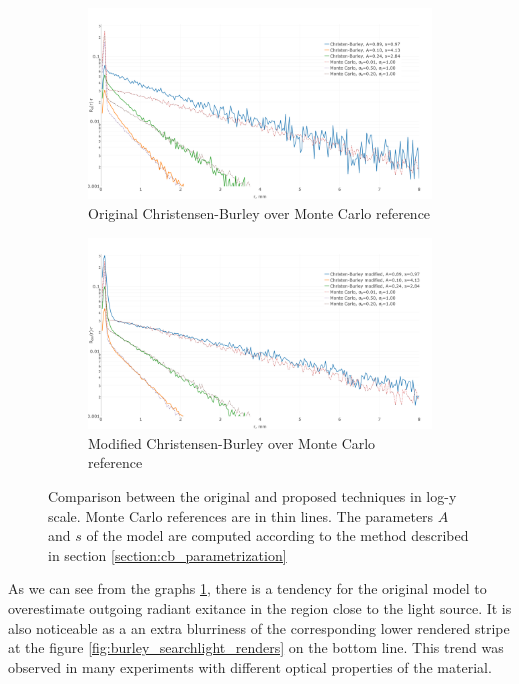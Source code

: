 \begin{figure}[h]
    \centering
    \begin{subfigure}{\textwidth}
        \includegraphics[width=\textwidth]{imgs/plots/cb_original_fitting}
        \caption{Original Christensen-Burley over Monte Carlo reference}
    \end{subfigure}
    \begin{subfigure}{\textwidth}
        \includegraphics[width=\textwidth]{imgs/plots/cb_modified_fitting}
        \caption{Modified Christensen-Burley over Monte Carlo reference}
    \end{subfigure}
    \caption{Comparison between the original and proposed techniques in log-y
    scale. Monte Carlo references are in thin lines. The parameters $A$ and $s$ of the model are
    computed according to the method described in section \ref{section:cb_parametrization}}
    \label{fig:burley_fitting}
\end{figure}

As we can see from the graphs \ref{fig:burley_fitting}, there is a tendency for
the original model to overestimate outgoing radiant exitance in the region close
to the light source. It is also noticeable as a an extra blurriness of the corresponding
lower rendered stripe at the figure \ref{fig:burley_searchlight_renders} on the bottom line. This
trend was observed in many experiments with different optical properties of the material.

